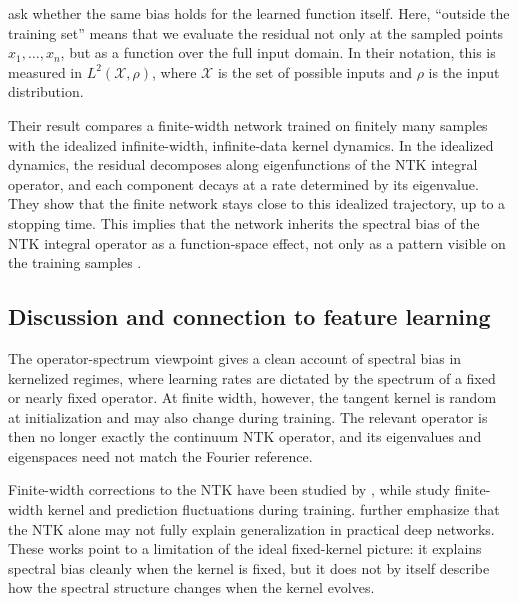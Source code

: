\begin{revblock}
	\citet{bowman2022spectralbiasoutsidetraining} ask whether the same bias holds
	for the learned function itself. Here, ``outside the training set'' means that
	we evaluate the residual not only at the sampled points \(x_1,\dots,x_n\), but
	as a function over the full input domain. In their notation, this is measured in
	\(L^2(\mathcal X,\rho)\), where \(\mathcal X\) is the set of possible inputs and
	\(\rho\) is the input distribution.

	Their result compares a finite-width network trained on finitely many samples
	with the idealized infinite-width, infinite-data kernel dynamics. In the
	idealized dynamics, the residual decomposes along eigenfunctions of the NTK
	integral operator, and each component decays at a rate determined by its
	eigenvalue. They show that the finite network stays close to
	this idealized trajectory, up to a stopping time. This implies that the network
	inherits the spectral bias of the NTK integral operator as a function-space
	effect, not only as a pattern visible on the training samples
	\citep{bowman2022spectralbiasoutsidetraining}.
\end{revblock}

\subsection{Discussion and connection to feature learning}

The operator-spectrum viewpoint gives a clean account of spectral bias in
kernelized regimes, where learning rates are dictated by the spectrum of a fixed
or nearly fixed operator. At finite width, however, the tangent kernel is random
at initialization and may also change during training. The relevant operator is
then no longer exactly the continuum NTK operator, and its eigenvalues and
eigenspaces need not match the Fourier reference.

Finite-width corrections to the NTK have been studied by
\citet{haninNica2019finite}, while \citet{bordelon2023dynamicsfinitewidthkernel}
study finite-width kernel and prediction fluctuations during training.
\citet{vyas2022limitationsntkunderstandinggeneralization} further emphasize
that the NTK alone may not fully explain generalization in practical deep
networks. These works point to a limitation of the ideal fixed-kernel picture:
it explains spectral bias cleanly when the kernel is fixed, but it does not by
itself describe how the spectral structure changes when the kernel evolves.

